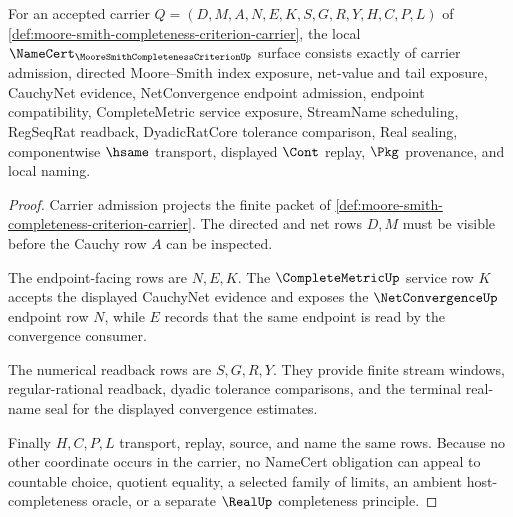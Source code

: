 \begin{theorem}
\label{thm:moore-smith-completeness-criterion-namecert-obligations}
For an accepted carrier $Q=(D,M,A,N,E,K,S,G,R,Y,H,C,P,L)$ of \autoref{def:moore-smith-completeness-criterion-carrier}, the local $\NameCert_{\MooreSmithCompletenessCriterionUp}$ surface consists exactly of carrier admission, directed Moore--Smith index exposure, net-value and tail exposure, CauchyNet evidence, NetConvergence endpoint admission, endpoint compatibility, CompleteMetric service exposure, StreamName scheduling, RegSeqRat readback, DyadicRatCore tolerance comparison, Real sealing, componentwise $\hsame$ transport, displayed $\Cont$ replay, $\Pkg$ provenance, and local naming.
\end{theorem}
\begin{proof}
Carrier admission projects the finite packet of \autoref{def:moore-smith-completeness-criterion-carrier}. The directed and net rows $D,M$ must be visible before the Cauchy row $A$ can be inspected.

The endpoint-facing rows are $N,E,K$. The $\CompleteMetricUp$ service row $K$ accepts the displayed CauchyNet evidence and exposes the $\NetConvergenceUp$ endpoint row $N$, while $E$ records that the same endpoint is read by the convergence consumer.

The numerical readback rows are $S,G,R,Y$. They provide finite stream windows, regular-rational readback, dyadic tolerance comparisons, and the terminal real-name seal for the displayed convergence estimates.

Finally $H,C,P,L$ transport, replay, source, and name the same rows. Because no other coordinate occurs in the carrier, no NameCert obligation can appeal to countable choice, quotient equality, a selected family of limits, an ambient host-completeness oracle, or a separate $\RealUp$ completeness principle.
\end{proof}

